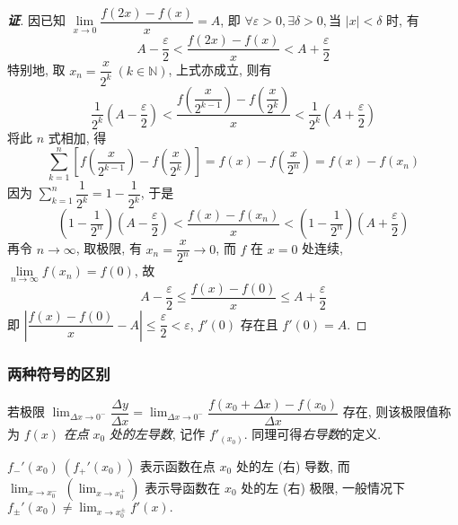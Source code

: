 \begin{proof}[{\songti \textbf{证}}]
    因已知 $\lim\limits_{x\to0}\dfrac{f(2x)-f(x)}{x}=A$, 即 $\forall \varepsilon>0,\exists\delta>0,\text{当 }|x|<\delta$ 时, 有
    $$A-\dfrac{\varepsilon }{2} <\dfrac{f(2x) -f(x) }{x} <A+\dfrac{\varepsilon }{2}$$
    特别地, 取 $x_n=\dfrac{x}{2^k}~  (k\in\mathbb{N})$, 上式亦成立, 则有
    $$\dfrac{1}{2^{k}}\left( A-\dfrac{\varepsilon }{2}\right)  <\dfrac{f\left( \dfrac{x}{2^{k-1}}\right) -f\left( \dfrac{x}{2^{k}}\right) }{x} <\dfrac{1}{2^{k}}\left( A+\dfrac{\varepsilon }{2}\right) $$
    将此 $n$ 式相加, 得
    $$\sum ^{n}_{k=1}\left[ f\left( \dfrac{x}{2^{k-1}}\right) -f\left( \dfrac{x}{2^{k}}\right) \right] =f(x) -f\left( \dfrac{x}{2^{n}}\right) =f(x) -f\left( x_{n}\right) $$
    因为 $\displaystyle\sum ^{n}_{k=1}\dfrac{1}{2^{k}}=1-\dfrac{1}{2^{k}}$, 于是
    $$\left( 1-\dfrac{1}{2^{n}}\right) \left( A-\dfrac{\varepsilon }{2}\right)  <\dfrac{f(x) -f\left( x_{n}\right) }{x} <\left( 1-\dfrac{1}{2^{n}}\right) \left( A+\dfrac{\varepsilon }{2}\right) $$
    再令 $n\to\infty$, 取极限, 有 $x_n=\dfrac{x}{2^n}\to0$, 而 $f$ 在 $x=0$ 处连续,  $\lim\limits_{n\to\infty}f(x_n)=f(0)$, 故
    $$A-\dfrac{\varepsilon }{2}\leqslant \dfrac{f(x) -f(0) }{x}\leqslant A+\dfrac{\varepsilon }{2}$$
    即 $\left| \dfrac{f(x) -f(0) }{x}-A\right| \leqslant \dfrac{\varepsilon }{2} <\varepsilon $, $f'(0)$ 存在且 $f'(0)=A.$
\end{proof}

\subsubsection{两种符号的区别}

\begin{definition}[左右导数]
    若极限 $\displaystyle\lim_{\Delta x\to 0^-}\dfrac{\Delta y}{\Delta x}=\lim_{\Delta x\to0^-}\dfrac{f(x_0+\Delta x)-f(x_0)}{\Delta x}$ 存在, 则该极限值称为 $f(x)$ \textit{在点} $x_0$ \textit{处的左导数}, 记作 $f'_(x_0)$.
    同理可得\textit{右导数}的定义.

    $f_-'(x_0)~(f_+'(x_0))$ 表示函数在点 $x_0$ 处的左 (右) 导数, 而 $\displaystyle\lim_{x\to x_0^-}~(\lim_{x\to x_0^+})$ 表示导函数在 $x_0$ 处的左 (右) 极限,
    一般情况下 $f_{\pm}'(x_0)\neq \displaystyle\lim_{x\to x_0^{\pm}}f'(x).$
\end{definition}

